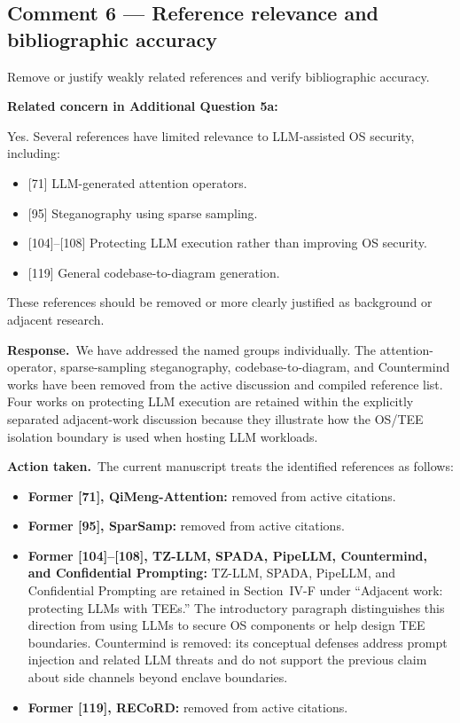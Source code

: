 \documentclass[11pt,a4paper]{article}
\newcommand{\response}{\par\textbf{Response.}\ }
\newcommand{\action}{\par\textbf{Action taken.}\ }
\begin{document}
\subsection{Comment 6 --- Reference relevance and bibliographic accuracy}
\begin{reviewcomment}
Remove or justify weakly related references and verify bibliographic accuracy.

\medskip
\textbf{Related concern in Additional Question 5a:}

Yes. Several references have limited relevance to LLM-assisted OS security, including:
\begin{itemize}
\item {[71]} LLM-generated attention operators.
\item {[95]} Steganography using sparse sampling.
\item {[104]--[108]} Protecting LLM execution rather than improving OS security.
\item {[119]} General codebase-to-diagram generation.
\end{itemize}
These references should be removed or more clearly justified as background or adjacent research.
\end{reviewcomment}

\response We have addressed the named groups individually. The attention-operator, sparse-sampling steganography, codebase-to-diagram, and Countermind works have been removed from the active discussion and compiled reference list. Four works on protecting LLM execution are retained within the explicitly separated adjacent-work discussion because they illustrate how the OS/TEE isolation boundary is used when hosting LLM workloads.

\action The current manuscript treats the identified references as follows:
\begin{itemize}
\item \textbf{Former [71], QiMeng-Attention:} removed from active citations.
\item \textbf{Former [95], SparSamp:} removed from active citations.
\item \textbf{Former [104]--[108], TZ-LLM, SPADA, PipeLLM, Countermind, and Confidential Prompting:} TZ-LLM, SPADA, PipeLLM, and Confidential Prompting are retained in Section~IV-F under ``Adjacent work: protecting LLMs with TEEs.'' The introductory paragraph distinguishes this direction from using LLMs to secure OS components or help design TEE boundaries. Countermind is removed: its conceptual defenses address prompt injection and related LLM threats and do not support the previous claim about side channels beyond enclave boundaries.
\item \textbf{Former [119], RECoRD:} removed from active citations.
\end{itemize}
\end{document}
